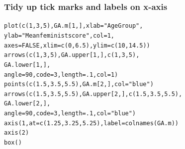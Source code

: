 \documentclass{beamer}\usepackage[]{graphicx}\usepackage[]{color}
\makeatletter
\newcommand{\hlnum}[1]{\textcolor[rgb]{0.533,0,0.133}{#1}}%
\newcommand{\hlstr}[1]{\textcolor[rgb]{0.667,0.267,0}{#1}}%
\newcommand{\hlstd}[1]{\textcolor[rgb]{0,0,0}{#1}}%
\newcommand{\hlkwc}[1]{\textcolor[rgb]{0,0,0.4}{#1}}%
\newcommand{\hlkwd}[1]{\textcolor[rgb]{0,0.267,0.4}{#1}}%
\newenvironment{kframe}{%
 \def\at@end@of@kframe{}%
 \ifinner\ifhmode%
  \def\at@end@of@kframe{\end{minipage}}%
  \begin{minipage}{\columnwidth}%
 \fi\fi%
 \def\FrameCommand##1{\hskip\@totalleftmargin \hskip-\fboxsep
 \colorbox{shadecolor}{##1}\hskip-\fboxsep
     \hskip-\linewidth \hskip-\@totalleftmargin \hskip\columnwidth}%
 \MakeFramed {\advance\hsize-\width
   \@totalleftmargin\z@ \linewidth\hsize
   \@setminipage}}%
 {\par\unskip\endMakeFramed%
 \at@end@of@kframe}
\newenvironment{knitrout}{}{} %
\makeatother
\begin{document}
\begin{frame}[fragile]
  \frametitle{Tidy up tick marks and labels on x-axis}
\begin{knitrout}
\color{fgcolor}\begin{kframe}
\begin{alltt}
\hlkwd{plot}\hlstd{(}\hlkwd{c}\hlstd{(}\hlnum{1}\hlstd{,} \hlnum{3}\hlstd{,} \hlnum{5}\hlstd{), GA.m[}\hlnum{1}\hlstd{, ],} \hlkwc{xlab} \hlstd{=} \hlstr{"Age Group"}\hlstd{,}
     \hlkwc{ylab} \hlstd{=} \hlstr{"Mean feminist score"}\hlstd{,}\hlkwc{col} \hlstd{=} \hlnum{1}\hlstd{,}
     \hlkwc{axes} \hlstd{=} \hlnum{FALSE}\hlstd{,} \hlkwc{xlim} \hlstd{=} \hlkwd{c}\hlstd{(}\hlnum{0}\hlstd{,} \hlnum{6.5}\hlstd{),} \hlkwc{ylim} \hlstd{=} \hlkwd{c}\hlstd{(}\hlnum{10}\hlstd{,} \hlnum{14.5}\hlstd{))}
\hlkwd{arrows}\hlstd{(}\hlkwd{c}\hlstd{(}\hlnum{1}\hlstd{,} \hlnum{3}\hlstd{,} \hlnum{5}\hlstd{), GA.upper[}\hlnum{1}\hlstd{, ],} \hlkwd{c}\hlstd{(}\hlnum{1}\hlstd{,} \hlnum{3}\hlstd{,} \hlnum{5}\hlstd{),}
       \hlstd{GA.lower[}\hlnum{1}\hlstd{, ],}
       \hlkwc{angle} \hlstd{=} \hlnum{90}\hlstd{,} \hlkwc{code} \hlstd{=} \hlnum{3}\hlstd{,} \hlkwc{length} \hlstd{=} \hlnum{.1}\hlstd{,} \hlkwc{col} \hlstd{=} \hlnum{1}\hlstd{)}
\hlkwd{points}\hlstd{(}\hlkwd{c}\hlstd{(}\hlnum{1.5}\hlstd{,} \hlnum{3.5}\hlstd{,} \hlnum{5.5}\hlstd{),GA.m[}\hlnum{2}\hlstd{, ],} \hlkwc{col} \hlstd{=} \hlstr{"blue"}\hlstd{)}
\hlkwd{arrows}\hlstd{(}\hlkwd{c}\hlstd{(}\hlnum{1.5}\hlstd{,} \hlnum{3.5}\hlstd{,} \hlnum{5.5}\hlstd{), GA.upper[}\hlnum{2}\hlstd{, ],} \hlkwd{c}\hlstd{(}\hlnum{1.5}\hlstd{,} \hlnum{3.5}\hlstd{,} \hlnum{5.5}\hlstd{),}
       \hlstd{GA.lower[}\hlnum{2}\hlstd{, ],}
       \hlkwc{angle} \hlstd{=} \hlnum{90}\hlstd{,} \hlkwc{code} \hlstd{=} \hlnum{3}\hlstd{,} \hlkwc{length} \hlstd{=} \hlnum{.1}\hlstd{,} \hlkwc{col} \hlstd{=} \hlstr{"blue"}\hlstd{)}
\hlkwd{axis}\hlstd{(}\hlnum{1}\hlstd{,} \hlkwc{at} \hlstd{=} \hlkwd{c}\hlstd{(}\hlnum{1.25}\hlstd{,} \hlnum{3.25}\hlstd{,} \hlnum{5.25}\hlstd{),} \hlkwc{label} \hlstd{=} \hlkwd{colnames}\hlstd{(GA.m))}
\hlkwd{axis}\hlstd{(}\hlnum{2}\hlstd{)}
\hlkwd{box}\hlstd{()}
\end{alltt}
\end{kframe}
\end{knitrout}
\end{frame} 
\end{document}
